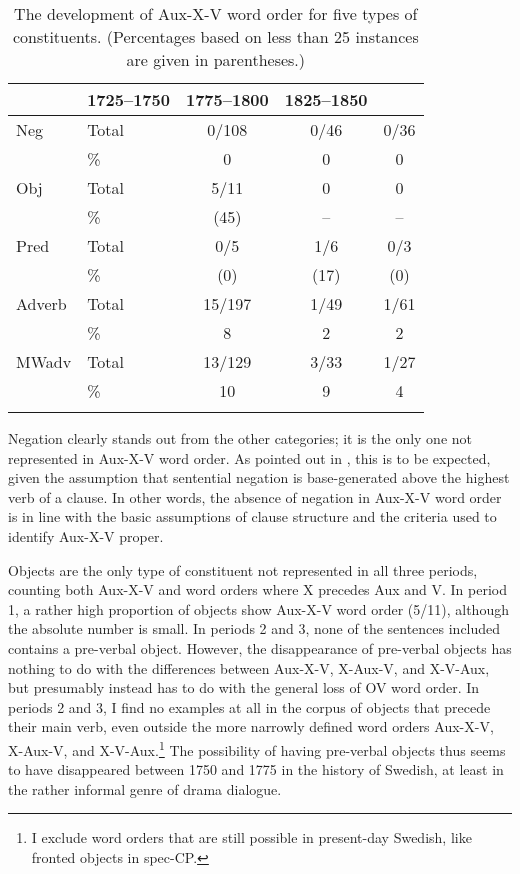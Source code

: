 \documentclass[output=paper, colorlinks, citecolor=brown]{langscibook}
\begin{document}
\begin{table}
\caption{The development of Aux-X-V word order for five types of constituents. (Percentages based on less than 25 instances are given in parentheses.)\label{tab:sangfelt:2}}
\begin{tabular}{ll ccc}
\lsptoprule
\multicolumn{2}{l}{Constituent type} & 1725–1750 & 1775–1800 & 1825–1850\\\midrule
Neg & Total & 0/108 & 0/46 & 0/36\\
    & \% & 0 & 0 & 0\\
Obj & Total & 5/11 & 0 & 0\\
    & \% & (45) & -- & --\\
Pred & Total & 0/5 & 1/6 & 0/3\\
     & \% & (0) & (17) & (0)\\
Adverb & Total & 15/197 & 1/49 & 1/61\\
       & \% & 8 & 2 & 2\\
MWadv & Total & 13/129 & 3/33 & 1/27\\
      & \% & 10 & 9 & 4\\
\lspbottomrule
\end{tabular}
\end{table}
 
 
Negation clearly stands out from the other categories; it is the only one not represented in Aux-X-V word order. As pointed out in , this is to be expected, given the assumption that sentential negation is base-generated above the highest verb of a clause. In other words, the absence of negation in Aux-X-V word order is in line with the basic assumptions of clause structure and the criteria used to identify Aux-X-V proper.


Objects are the only type of constituent not represented in all three periods, counting both Aux-X-V and word orders where X precedes Aux and V. In period 1, a rather high proportion of objects show Aux-X-V word order (5/11), although the absolute number is small. In periods 2 and 3, none of the sentences included contains a pre-verbal object. However, the disappearance of pre-verbal objects has nothing to do with the differences between Aux-X-V, X-Aux-V, and X-V-Aux, but presumably instead has to do with the general loss of OV word order. In periods 2 and 3, I find no examples at all in the corpus of objects that precede their main verb, even outside the more narrowly defined word orders Aux-X-V, X-Aux-V, and X-V-Aux.\footnote{I exclude word orders that are still possible in present-day Swedish, like fronted objects in spec-CP.} The possibility of having pre-verbal objects thus seems to have disappeared between 1750 and 1775 in the history of Swedish, at least in the rather informal genre of drama dialogue.
\end{document}
